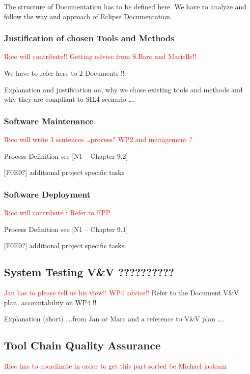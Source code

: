 \documentclass{template/openetcs_article}
\begin{document}
The structure of Documentation has to be defined here. We have to analyze and follow the way and approach of Eclipse Documentation. 


\subsubsection{Justification of chosen Tools and Methods}
\textcolor{red}{Rico will contribute!! Getting advice from S.Baro and Marielle!!}

We have to refer here to 2 Documents !!

Explanation and justification on, why we chose existing tools and methods and why they are compliant to SIL4 scenario {\dots}.



\subsubsection{Software Maintenance}
\textcolor{red}{Rico will write 3 sentences {\dots}process? WP2 and management ?}

Process Definition see [N1 -- Chapter 9.2]

[F0E0?] additional project specific tasks


\subsubsection{Software Deployment}
\textcolor{red}{Rico will contribute : Refer to FPP}

Process Definition see [N1 -- Chapter 9.1]

[F0E0?] additional project specific tasks



\subsection{System Testing V\&V ?????????? }
\textcolor{red}{Jan has to please tell us his view!! WP4 advice!!}
Refer to the Document V\&V plan, accountability on WP4 !!

Explanation (short)  {\dots}.from Jan or Marc and a reference to V\&V plan {\dots}.


\subsection{Tool Chain Quality Assurance}
\textcolor{red}{Rico has to coordinate in order to get this part sorted be Michael jastram}
\end{document}
